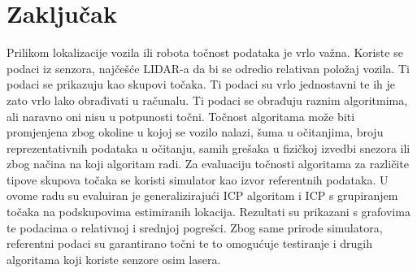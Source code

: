 \chapter{Zaključak}
Prilikom lokalizacije vozila ili robota točnost podataka je vrlo važna. Koriste se podaci iz senzora, najčešće LIDAR-a da bi se odredio relativan položaj vozila. Ti podaci se prikazuju kao skupovi točaka. Ti podaci su vrlo jednostavni te ih je zato vrlo lako obrađivati u računalu. Ti podaci se obrađuju raznim algoritmima, ali naravno oni nisu u potpunosti točni. Točnost algoritama može biti promjenjena zbog okoline u kojoj se vozilo nalazi, šuma u očitanjima, broju reprezentativnih podataka u očitanju, samih grešaka u fizičkoj izvedbi snezora ili zbog načina na koji algoritam radi. Za evaluaciju točnosti algoritama za različite tipove skupova točaka se koristi simulator kao izvor referentnih podataka. U ovome radu su evaluiran je generalizirajući ICP algoritam i ICP s grupiranjem točaka na podskupovima estimiranih lokacija. Rezultati su prikazani s grafovima te podacima o relativnoj i srednjoj pogrešci. Zbog same prirode simulatora, referentni podaci su garantirano točni te to omogućuje testiranje i drugih algoritama koji koriste senzore osim lasera.
